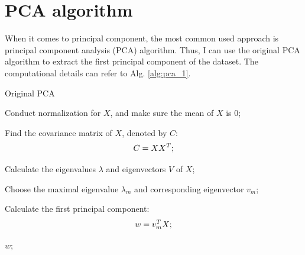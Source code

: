 \documentclass[12pt,a4paper]{article}
\theoremstyle{definition}
\begin{document}
\noindent
\noindent{}

\section{PCA algorithm}

When it comes to principal component, the most common used approach is principal component analysis (PCA) algorithm. Thus, I can use the original PCA algorithm to extract the first principal component of the dataset. The computational details can refer to Alg. \ref{alg:pca_1}.

\vspace{0.01\linewidth}
\begin{algorithm}[H]
	\caption{Original PCA}
	\label{alg:pca_1}
	\vspace{0.25\baselineskip}
	
	
	Conduct normalization for $X$, and make sure the mean of $X$ is 0;
	
	Find the covariance matrix of $X$, denoted by $C$:
	\begin{equation*}
		\centering
		C = XX^{T};
	\end{equation*}
	
	Calculate the eigenvalues $\lambda$ and eigenvectors $V$ of $X$;
	
	Choose the maximal eigenvalue $\lambda_{m}$ and corresponding eigenvector $v_{m}$;
	
	Calculate the first principal component:
	\begin{equation*}
		\centering
		w = v_{m}^{T}X;
	\end{equation*}
	
	\Return $w$;
\end{algorithm}
\vspace{0.01\linewidth}
\end{document}
